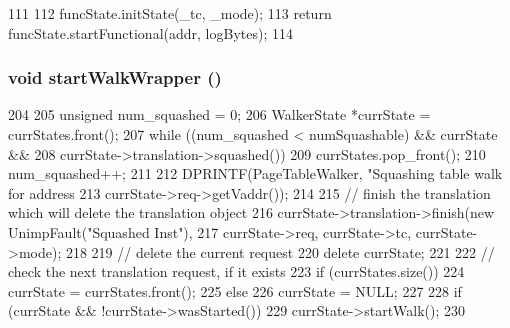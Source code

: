 \begin{DoxyCode}
111 {
112     funcState.initState(_tc, _mode);
113     return funcState.startFunctional(addr, logBytes);
114 }
\end{DoxyCode}
\hypertarget{classX86ISA_1_1Walker_a5cbf57f9ccdc6270d898ddca6d54905a}{
\subsubsection[{startWalkWrapper}]{\setlength{\rightskip}{0pt plus 5cm}void startWalkWrapper ()}}
\label{classX86ISA_1_1Walker_a5cbf57f9ccdc6270d898ddca6d54905a}



\begin{DoxyCode}
204 {
205     unsigned num_squashed = 0;
206     WalkerState *currState = currStates.front();
207     while ((num_squashed < numSquashable) && currState &&
208         currState->translation->squashed()) {
209         currStates.pop_front();
210         num_squashed++;
211 
212         DPRINTF(PageTableWalker, "Squashing table walk for address %
213             currState->req->getVaddr());
214 
215         // finish the translation which will delete the translation object
216         currState->translation->finish(new UnimpFault("Squashed Inst"),
217                 currState->req, currState->tc, currState->mode);
218 
219         // delete the current request
220         delete currState;
221 
222         // check the next translation request, if it exists
223         if (currStates.size())
224             currState = currStates.front();
225         else
226             currState = NULL;
227     }
228     if (currState && !currState->wasStarted())
229         currState->startWalk();
230 }
\end{DoxyCode}


